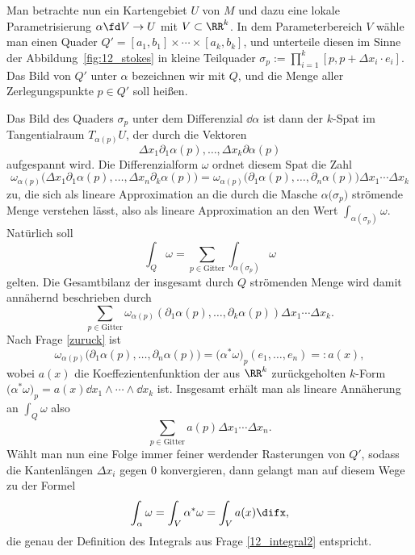 \begin{antwort}
  Man betrachte nun ein Kartengebiet $U$ von $M$ und dazu eine 
  lokale Parametrisierung $\alpha \fd V \to U$ mit 
  $V\subset \RR^k$. In dem Parameterbereich $V$ wähle man einen Quader 
  $Q'=[a_1,b_1]\times\cdots \times [a_k,b_k]$, 
  und unterteile diesen im Sinne der Abbildung~\ref{fig:12_stokes} 
  in kleine Teilquader 
  $\sigma_p := \prod_{i=1}^k [ p, p+\Delta x_i \cdot e_i ]$. 
  Das Bild von $Q'$ unter $\alpha$ bezeichnen wir mit $Q$, und 
  die Menge aller Zerlegungspunkte $p\in Q'$ soll  heißen. 

  \noindent%
  Das Bild des Quaders $\sigma_p$ unter dem 
  Differenzial $\dd \alpha$ ist dann der $k$-Spat im 
  Tangentialraum $T_{\alpha(p)} U$, der durch die Vektoren    
  \[
  \Delta x_1 \partial_1 \alpha(p), \ldots, \Delta x_k \partial \alpha(p)
  \]
  aufgespannt wird. Die Differenzialform $\omega$ ordnet diesem Spat die Zahl  
  \[
  \omega_{\alpha(p)} 
  \big( \Delta x_1 \partial_1\alpha(p),\ldots, 
  \Delta x_n \partial_k \alpha(p) \big) = 
  \omega_{\alpha(p)} 
  \big(\partial_1\alpha(p),\ldots, 
  \partial_n\alpha(p) \big)  \Delta x_1 \cdots \Delta x_k
  \]
  zu, die sich als lineare Approximation an die durch die Masche 
  $\alpha\big( \sigma_p \big)$ strömende Menge verstehen lässt, also 
  als lineare Approximation an den Wert $\int_{\alpha(\sigma_p)} 
  \omega$. Natürlich soll 
  \[
  \int_Q \omega = \sum_{p \in \text{Gitter} } \int_{\alpha(\sigma_p)} \omega 
  \]
  gelten. Die Gesamtbilanz der insgesamt durch $Q$ strömenden Menge 
  wird damit annähernd beschrieben durch
  \[
  \sum_{p\in \text{Gitter}} \omega_{\alpha(p)}  
  \left( \partial_1 \alpha(p), \ldots, \partial_k \alpha(p) \right) 
  \Delta x_1 \cdots  \Delta x_k.
  \]
  Nach Frage \ref{zuruck} ist 
  \[
  \omega_{\alpha(p)}  
  \big( \partial_1 \alpha(p), \ldots, \partial_n \alpha(p) \big) = 
  \big( \alpha^* \omega )_p ( e_1,\ldots, e_n ) = : a(x),
  \]
  wobei $a(x)$ die Koeffezientenfunktion der 
  aus $\RR^k$ zurückgeholten $k$-Form 
  $\big( \alpha^* \omega )_p= a(x) \dd x_1 \wedge \cdots \wedge \dd x_k$ ist. 
  Insgesamt erhält man als lineare Annäherung an $\int_Q \omega$ also 
  \[
  \sum_{p\in\text{Gitter}} a(p) \Delta x_1\cdots \Delta x_n.
  \]
  Wählt man nun eine Folge immer feiner werdender Rasterungen 
  von $Q'$, sodass die Kantenlängen $\Delta x_i$ gegen $0$ konvergieren, 
  dann gelangt man auf diesem Wege zu der Formel
  \[
  \int_\alpha \omega = \int_V \alpha^* \omega = \int_V a(x) \difx,
  \]
  die genau der Definition des Integrals aus Frage \ref{12_integral2} 
  entspricht. 
  \AntEnd   
\end{antwort} 

